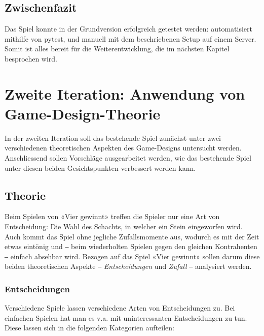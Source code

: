 \documentclass[a4paper,11pt,hidelinks]{scrartcl}
\begin{document}
\subsection{Zwischenfazit}

Das Spiel konnte in der Grundversion erfolgreich getestet werden: automatisiert mithilfe von pytest, und manuell mit dem beschriebenen Setup auf einem Server. Somit ist alles bereit für die Weiterentwicklung, die im nächsten Kapitel besprochen wird.

\newpage

\section{Zweite Iteration: Anwendung von Game-Design-Theorie}

In der zweiten Iteration soll das bestehende Spiel zunächst unter zwei verschiedenen theoretischen Aspekten des Game-Designs untersucht werden. Anschliessend sollen Vorschläge ausgearbeitet werden, wie das bestehende Spiel unter diesen beiden Gesichtspunkten verbessert werden kann.

\subsection{Theorie}

Beim Spielen von «Vier gewinnt» treffen die Spieler nur eine Art von Entscheidung: Die Wahl des Schachts, in welcher ein Stein eingeworfen wird. Auch kommt das Spiel ohne jegliche Zufallsmomente aus, wodurch es mit der Zeit etwas eintönig und ‒ beim wiederholten Spielen gegen den gleichen Kontrahenten ‒ einfach absehbar wird. Bezogen auf das Spiel «Vier gewinnt» sollen darum diese beiden theoretischen Aspekte ‒ \textit{Entscheidungen} und \textit{Zufall} ‒ analysiert werden.

\subsubsection{Entscheidungen}

Verschiedene Spiele lassen verschiedene Arten von Entscheidungen zu. Bei einfachen Spielen hat man es v.a. mit uninteressanten Entscheidungen zu tun. Diese lassen sich in die folgenden Kategorien aufteilen:
\end{document}
